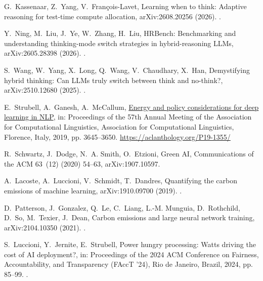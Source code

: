 \documentclass[final,5p,times,twocolumn]{elsarticle}
\theoremstyle{plain}
\begin{document}
G.~Kassenaar, Z.~Yang, V.~Fran{\c{c}}ois-Lavet, Learning when to think:
  Adaptive reasoning for test-time compute allocation, arXiv:2608.20256 (2026).
\newblock \href {http://arxiv.org/abs/2608.20256} {}.

Y.~Ning, M.~Liu, J.~Ye, W.~Zhang, H.~Liu, {HRBench}: Benchmarking and
  understanding thinking-mode switch strategies in hybrid-reasoning {LLMs},
  arXiv:2605.28398 (2026).
\newblock \href {http://arxiv.org/abs/2605.28398} {}.

S.~Wang, W.~Yang, X.~Long, Q.~Wang, V.~Chaudhary, X.~Han, Demystifying hybrid
  thinking: Can {LLMs} truly switch between think and no-think?,
  arXiv:2510.12680 (2025).
\newblock \href {http://arxiv.org/abs/2510.12680} {}.

E.~Strubell, A.~Ganesh, A.~McCallum,
  \href{https://aclanthology.org/P19-1355/}{Energy and policy considerations
  for deep learning in {NLP}}, in: Proceedings of the 57th Annual Meeting of
  the Association for Computational Linguistics, Association for Computational
  Linguistics, Florence, Italy, 2019, pp. 3645--3650.
\newline\urlprefix\url{https://aclanthology.org/P19-1355/}

R.~Schwartz, J.~Dodge, N.~A. Smith, O.~Etzioni, Green {AI}, Communications of
  the ACM 63~(12) (2020) 54--63, arXiv:1907.10597.

A.~Lacoste, A.~Luccioni, V.~Schmidt, T.~Dandres, Quantifying the carbon
  emissions of machine learning, arXiv:1910.09700 (2019).
\newblock \href {http://arxiv.org/abs/1910.09700} {}.

D.~Patterson, J.~Gonzalez, Q.~Le, C.~Liang, L.-M. Munguia, D.~Rothchild, D.~So,
  M.~Texier, J.~Dean, Carbon emissions and large neural network training,
  arXiv:2104.10350 (2021).
\newblock \href {http://arxiv.org/abs/2104.10350} {}.

S.~Luccioni, Y.~Jernite, E.~Strubell, Power hungry processing: Watts driving
  the cost of {AI} deployment?, in: Proceedings of the 2024 ACM Conference on
  Fairness, Accountability, and Transparency (FAccT '24), Rio de Janeiro,
  Brazil, 2024, pp. 85--99.
\newblock \href {https://doi.org/10.1145/3630106.3658542}
  {}.
\end{document}
